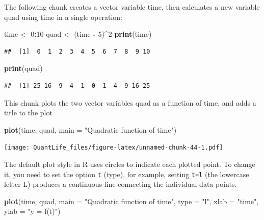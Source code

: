 \documentclass[
]{book}
\newenvironment{Shaded}{\begin{snugshade}}{\end{snugshade}}
\newcommand{\DataTypeTok}[1]{\textcolor[rgb]{0.13,0.29,0.53}{#1}}
\newcommand{\DecValTok}[1]{\textcolor[rgb]{0.00,0.00,0.81}{#1}}
\newcommand{\KeywordTok}[1]{\textcolor[rgb]{0.13,0.29,0.53}{\textbf{#1}}}
\newcommand{\NormalTok}[1]{#1}
\newcommand{\OperatorTok}[1]{\textcolor[rgb]{0.81,0.36,0.00}{\textbf{#1}}}
\newcommand{\StringTok}[1]{\textcolor[rgb]{0.31,0.60,0.02}{#1}}
\theoremstyle{definition}
\theoremstyle{definition}
\theoremstyle{definition}
\theoremstyle{remark}
\begin{document}
The following chunk creates a vector variable time, then calculates a new variable quad using time in a single operation:

\begin{Shaded}
\begin{Highlighting}[]
\NormalTok{time \textless{}{-}}\StringTok{ }\DecValTok{0}\OperatorTok{:}\DecValTok{10}
\NormalTok{quad \textless{}{-}}\StringTok{ }\NormalTok{(time }\OperatorTok{{-}}\StringTok{ }\DecValTok{5}\NormalTok{)}\OperatorTok{\^{}}\DecValTok{2}
\KeywordTok{print}\NormalTok{(time)}
\end{Highlighting}
\end{Shaded}

\begin{verbatim}
##  [1]  0  1  2  3  4  5  6  7  8  9 10
\end{verbatim}

\begin{Shaded}
\begin{Highlighting}[]
\KeywordTok{print}\NormalTok{(quad)}
\end{Highlighting}
\end{Shaded}

\begin{verbatim}
##  [1] 25 16  9  4  1  0  1  4  9 16 25
\end{verbatim}

This chunk plots the two vector variables quad as a function of time, and adds a title to the plot

\begin{Shaded}
\begin{Highlighting}[]
\KeywordTok{plot}\NormalTok{(time, quad, }\DataTypeTok{main =} \StringTok{"Quadratic function of time"}\NormalTok{)}
\end{Highlighting}
\end{Shaded}

\texttt{[image: QuantLife\_files/figure-latex/unnamed-chunk-44-1.pdf]}

The default plot style in R uses circles to indicate each plotted point. To change it, you need to set the option \texttt{t} (type), for example, setting \texttt{t=\textquotesingle{}l\textquotesingle{}} (the lowercase letter L) produces a continuous line connecting the individual data points.

\begin{Shaded}
\begin{Highlighting}[]
\KeywordTok{plot}\NormalTok{(time, quad, }\DataTypeTok{main =} \StringTok{"Quadratic function of time"}\NormalTok{, }\DataTypeTok{type =} \StringTok{"l"}\NormalTok{, }\DataTypeTok{xlab =} \StringTok{"time"}\NormalTok{, }
    \DataTypeTok{ylab =} \StringTok{"y = f(t)"}\NormalTok{)}
\end{Highlighting}
\end{Shaded}
\end{document}
